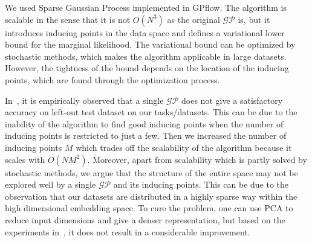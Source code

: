 We used Sparse Gaussian Process implemented in GPflow. The algorithm is scalable in the sense that it is not $O(N^3)$ as the original $\mathcal{GP}$ is, but it introduces inducing points in the data space and defines a variational lower bound for the marginal likelihood. The variational bound can be optimized by stochastic methods, which makes the algorithm applicable in large datasets. However, the tightness of the bound depends on the location of the inducing points, which are found through the optimization process. 

In~\citep{dehghani:2018:ICLR}, it is empirically observed that a single $\mathcal{GP}$ does not give a satisfactory accuracy on left-out test dataset on our tasks/datasets. This can be due to the inability of the algorithm to find good inducing points when the number of inducing points is restricted to just a few. Then we increased the number of inducing points $M$ which trades off the scalability of the algorithm because it scales with $O(NM^2)$. Moreover, apart from scalability which is partly solved by stochastic methods, we argue that the structure of the entire space may not be explored well by a single $\mathcal{GP}$ and its inducing points. This can be due to the observation that our datasets are distributed in a highly sparse way within the high dimensional embedding space. To cure the problem, one can use PCA to reduce input dimensions and give a denser representation, but based on the experiments in~\citep{dehghani:2018:ICLR}, it does not result in a considerable improvement. 
%

